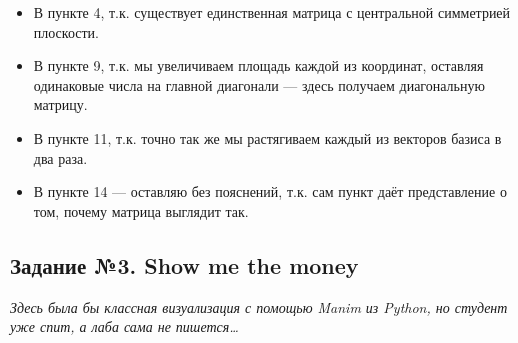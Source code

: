 \documentclass[a3paper,14pt]{extarticle}
\begin{document}
\begin{itemize}
    \item В пункте 4, т.к. существует единственная матрица с центральной симметрией плоскости.
    \item В пункте 9, т.к. мы увеличиваем площадь каждой из координат, оставляя одинаковые числа на главной диагонали --- здесь получаем диагональную матрицу.
    \item В пункте 11, т.к. точно так же мы растягиваем каждый из векторов базиса в два раза.
    \item В пункте 14 --- оставляю без пояснений, т.к. сам пункт даёт представление о том, почему матрица выглядит так.
\end{itemize}
\subsection*{\centering Задание №3. Show me the money}
\textit{Здесь была бы классная визуализация с помощью Manim из Python, но студент уже спит, а лаба сама не пишется\dots}
\end{document}
